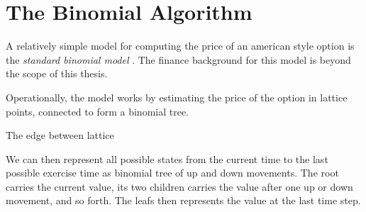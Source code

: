 \section{The Binomial Algorithm}

A relatively simple model for computing the price of an american style option
is the \emph{standard binomial model} . The finance background for this model is beyond the
scope of this thesis.

Operationally, the model works by estimating the price of the option in
lattice points, connected to form a binomial tree.


The edge between lattice


We can then represent all possible states from the current time to the
last possible exercise time as binomial tree of up and down
movements. The root carries the current value, its two children
carries the value after one up or down movement, and so forth. The
leafs then represents the value at the last time step.
